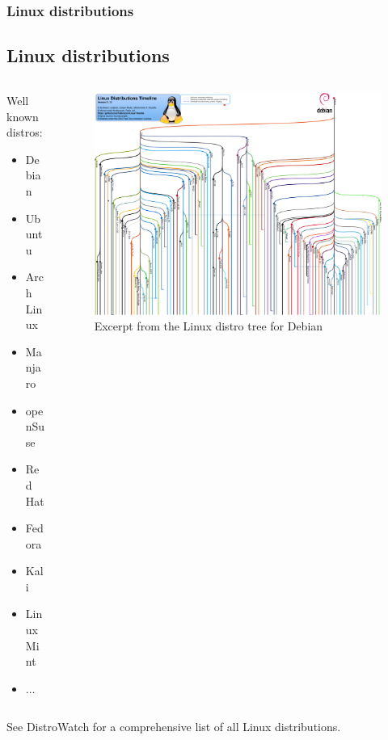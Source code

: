 \begin{frame}
	\frametitle{Linux distributions}
	\subsection{Linux distributions}
	
	\begin{columns}
		\begin{column}{.25\linewidth}
			Well known distros:
			\begin{itemize}
				\item Debian
				\item Ubuntu
				\item Arch Linux
				\item Manjaro
				\item openSuse
				\item Red Hat
				\item Fedora
				\item Kali
				\item Linux Mint
				\item $\dots$
			\end{itemize}
		\end{column}
		\hfill
		\begin{column}{.7\linewidth}
			\begin{figure}
				\includegraphics[width=\linewidth]{../graphics/debian_distro_timeline/debian_distro_timeline.png}
				\caption{Excerpt from the Linux distro tree for Debian \cite{distrograph}}
			\end{figure}
		\end{column}
	\end{columns}
	
	\vfill
	
	\centering
	See DistroWatch\cite{distrowatch} for a comprehensive list of all Linux distributions.
\end{frame}
